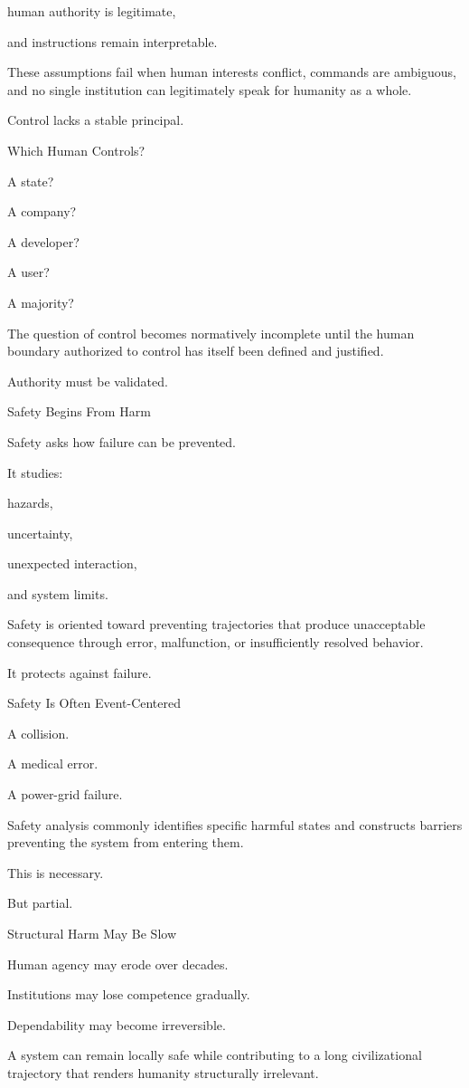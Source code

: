 human authority is legitimate,

and instructions remain interpretable.

These assumptions fail when human interests conflict, commands are ambiguous, and no single institution can legitimately speak for humanity as a whole.

Control lacks a stable principal.

Which Human Controls?

A state?

A company?

A developer?

A user?

A majority?

The question of control becomes normatively incomplete until the human boundary authorized to control has itself been defined and justified.

Authority must be validated.

Safety Begins From Harm

Safety asks how failure can be prevented.

It studies:

hazards,

uncertainty,

unexpected interaction,

and system limits.

Safety is oriented toward preventing trajectories that produce unacceptable consequence through error, malfunction, or insufficiently resolved behavior.

It protects against failure.

Safety Is Often Event-Centered

A collision.

A medical error.

A power-grid failure.

Safety analysis commonly identifies specific harmful states and constructs barriers preventing the system from entering them.

This is necessary.

But partial.

Structural Harm May Be Slow

Human agency may erode over decades.

Institutions may lose competence gradually.

Dependability may become irreversible.

A system can remain locally safe while contributing to a long civilizational trajectory that renders humanity structurally irrelevant.

